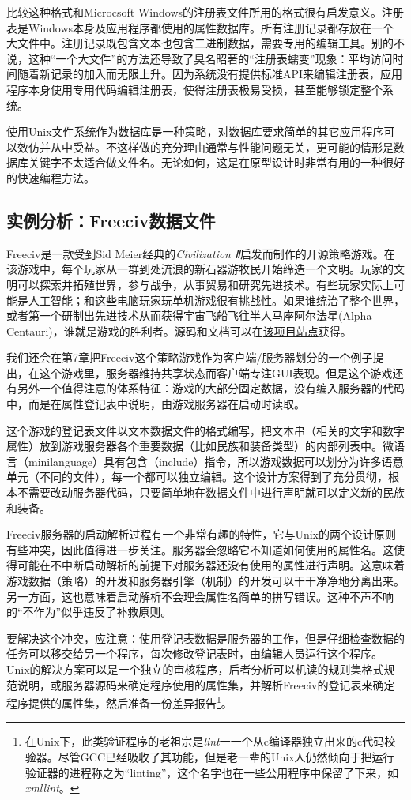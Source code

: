 \documentclass[12pt,oneside]{book}
\begin{document}
比较这种格式和Microcsoft Windows的注册表文件所用的格式很有启发意义。注册表是Windows本身及应用程序都使用的属性数据库。所有注册记录都存放在一个大文件中。注册记录既包含文本也包含二进制数据，需要专用的编辑工具。别的不说，这种“一个大文件”的方法还导致了臭名昭著的“注册表蠕变”现象：平均访问时间随着新记录的加入而无限上升。因为系统没有提供标准API来编辑注册表，应用程序本身使用专用代码编辑注册表，使得注册表极易受损，甚至能够锁定整个系统。

使用Unix文件系统作为数据库是一种策略，对数据库要求简单的其它应用程序可以效仿并从中受益。不这样做的充分理由通常与性能问题无关，更可能的情形是数据库关键字不太适合做文件名。无论如何，这是在原型设计时非常有用的一种很好的快速编程方法。


\subsection{实例分析：Freeciv数据文件}
Freeciv是一款受到Sid Meier经典的\textit{Civilization Ⅱ}启发而制作的开源策略游戏。在该游戏中，每个玩家从一群到处流浪的新石器游牧民开始缔造一个文明。玩家的文明可以探索并拓殖世界，参与战争，从事贸易和研究先进技术。有些玩家实际上可能是人工智能；和这些电脑玩家玩单机游戏很有挑战性。如果谁统治了整个世界，或者第一个研制出先进技术从而获得宇宙飞船飞往半人马座阿尔法星(Alpha Centauri)，谁就是游戏的胜利者。源码和文档可以在\href{http://www.freeciv.org/}{该项目站点}获得。

我们还会在第7章把Freeciv这个策略游戏作为客户端/服务器划分的一个例子提出，在这个游戏里，服务器维持共享状态而客户端专注GUI表现。但是这个游戏还有另外一个值得注意的体系特征：游戏的大部分固定数据，没有编入服务器的代码中，而是在属性登记表中说明，由游戏服务器在启动时读取。

这个游戏的登记表文件以文本数据文件的格式编写，把文本串（相关的文字和数字属性）放到游戏服务器各个重要数据（比如民族和装备类型）的内部列表中。微语言（minilanguage）具有包含（include）指令，所以游戏数据可以划分为许多语意单元（不同的文件），每一个都可以独立编辑。这个设计方案得到了充分贯彻，根本不需要改动服务器代码，只要简单地在数据文件中进行声明就可以定义新的民族和装备。

Freeciv服务器的启动解析过程有一个非常有趣的特性，它与Unix的两个设计原则有些冲突，因此值得进一步关注。服务器会忽略它不知道如何使用的属性名。这使得可能在不中断启动解析的前提下对服务器还没有使用的属性进行声明。这意味着游戏数据（策略）的开发和服务器引擎（机制）的开发可以干干净净地分离出来。另一方面，这也意味着启动解析不会理会属性名简单的拼写错误。这种不声不响的“不作为”似乎违反了补救原则。

要解决这个冲突，应注意：使用登记表数据是服务器的工作，但是仔细检查数据的任务可以移交给另一个程序，每次修改登记表时，由编辑人员运行这个程序。Unix的解决方案可以是一个独立的审核程序，后者分析可以机读的规则集格式规范说明，或服务器源码来确定程序使用的属性集，并解析Freeciv的登记表来确定程序提供的属性集，然后准备一份差异报告\footnote{在Unix下，此类验证程序的老祖宗是\textit{lint}一一个从c编译器独立出来的c代码校验器。尽管GCC已经吸收了其功能，但是老一辈的Unix人仍然倾向于把运行验证器的进程称之为“linting”，这个名字也在一些公用程序中保留了下来，如\textit{xmllint}。}。
\end{document}
